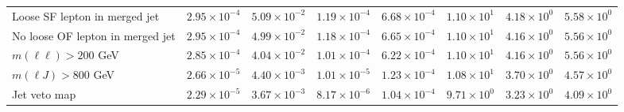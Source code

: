 \begin{table}[htp]
{\begin{tabular}{l | c c c c | c c c}
      Loose SF lepton in merged jet & $2.95 \times 10^{-4}$ & $5.09 \times 10^{-2}$ & $1.19 \times 10^{-4}$ & $6.68 \times 10^{-4}$ & $1.10 \times 10^{1}$ & $4.18 \times 10^{0}$ & $5.58 \times 10^{0}$ \\
      No loose OF lepton in merged jet & $2.95 \times 10^{-4}$ & $4.99 \times 10^{-2}$ & $1.18 \times 10^{-4}$ & $6.65 \times 10^{-4}$ & $1.10 \times 10^{1}$ & $4.16 \times 10^{0}$ & $5.56 \times 10^{0}$ \\
      $m(\ell\ell) > 200$ GeV & $2.85 \times 10^{-4}$ & $4.04 \times 10^{-2}$ & $1.01 \times 10^{-4}$ & $6.22 \times 10^{-4}$ & $1.10 \times 10^{1}$ & $4.16 \times 10^{0}$ & $5.56 \times 10^{0}$ \\
      $m(\ell J) > 800$ GeV & $2.66 \times 10^{-5}$ & $4.40 \times 10^{-3}$ & $1.01 \times 10^{-5}$ & $1.23 \times 10^{-4}$ & $1.08 \times 10^{1}$ & $3.70 \times 10^{0}$ & $4.57 \times 10^{0}$ \\
      Jet veto map & $2.29 \times 10^{-5}$ & $3.67 \times 10^{-3}$ & $8.17 \times 10^{-6}$ & $1.04 \times 10^{-4}$ & $9.71 \times 10^{0}$ & $3.23 \times 10^{0}$ & $4.09 \times 10^{0}$ \\
      \hline
    \end{tabular}
  }
\end{table}
